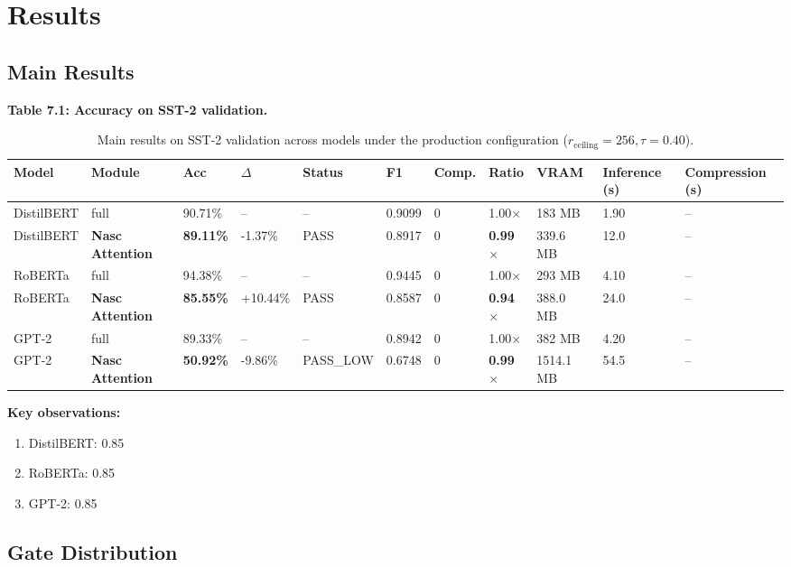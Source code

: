 
\section{Results}

\subsection{Main Results}

\textbf{Table 7.1: Accuracy on SST-2 validation.}

\begin{table}[t]
\centering
\small
\begin{tabular}{lllllllllll}
\toprule
\textbf{Model} & \textbf{Module} & \textbf{Acc} & \textbf{$\Delta$} & \textbf{Status} & \textbf{F1} & \textbf{Comp.} & \textbf{Ratio} & \textbf{VRAM} & \textbf{Inference (s)} & \textbf{Compression (s)} \\
\midrule
DistilBERT & full & 90.71\% & -- & -- & 0.9099 & 0 & 1.00$\times$ & 183 MB & 1.90 & -- \\
DistilBERT & \textbf{Nasc Attention} & \textbf{89.11\%} & -1.37\% & PASS & 0.8917 & 0 & \textbf{0.99$\times$} & 339.6 MB & 12.0 & -- \\
RoBERTa & full & 94.38\% & -- & -- & 0.9445 & 0 & 1.00$\times$ & 293 MB & 4.10 & -- \\
RoBERTa & \textbf{Nasc Attention} & \textbf{85.55\%} & +10.44\% & PASS & 0.8587 & 0 & \textbf{0.94$\times$} & 388.0 MB & 24.0 & -- \\
GPT-2 & full & 89.33\% & -- & -- & 0.8942 & 0 & 1.00$\times$ & 382 MB & 4.20 & -- \\
GPT-2 & \textbf{Nasc Attention} & \textbf{50.92\%} & -9.86\% & PASS\_LOW & 0.6748 & 0 & \textbf{0.99$\times$} & 1514.1 MB & 54.5 & -- \\
\bottomrule
\end{tabular}
\caption{Main results on SST-2 validation across models under the production configuration ($r_{\mathrm{ceiling}}=256, \tau=0.40$).}
\label{tab:main_sst2}
\end{table}

\textbf{Key observations:}

\begin{enumerate}
\item DistilBERT: 0.85
\item RoBERTa: 0.85
\item GPT-2: 0.85

\end{enumerate}
\subsection{Gate Distribution}

